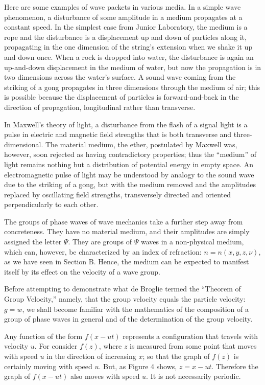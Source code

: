 Here are some examples of wave packets in various media. In a simple
wave phenomenon, a disturbance of some amplitude in a medium propagates
at a constant speed. In the simplest case from Junior Laboratory, the
medium is a rope and the disturbance is a displacement up and down of
particles along it, propagating in the one dimension of the string's
extension when we shake it up and down once. When a rock is dropped into
water, the disturbance is again an up-and-down displacement in the
medium of water, but now the propagation is in two dimensions across the
water's surface. A sound wave coming from the striking of a gong
propagates in three dimensions through the medium of air; this is
possible because the displacement of particles is forward-and-back in
the direction of propagation, longitudinal rather than transverse.

In Maxwell's theory of light, a disturbance from the flash of a signal
light is a pulse in electric and magnetic field strengths that is both
transverse and three-dimensional. The material medium, the ether,
postulated by Maxwell was, however, soon rejected as having
contradictory properties; thus the ``medium'' of light remains nothing
but a distribution of potential energy in empty space. An
electromagnetic pulse of light may be understood by analogy to the sound
wave due to the striking of a gong, but with the medium removed and the
amplitudes replaced by oscillating field strengths, transversely
directed and oriented perpendicularly to each other.

The groups of phase waves of wave mechanics take a further step away
from concreteness. They have no material medium, and their amplitudes
are simply assigned the letter $\Psi$. They are groups of $\Psi$
waves in a non-physical medium, which can, however, be characterized by
an index of refraction: $n = n(x,y,z,\nu)$, as we have seen in
Section B. Hence, the medium can be expected to manifest itself by its
effect on the velocity of a wave group.

Before attempting to demonstrate what de Broglie termed the ``Theorem of
Group Velocity,'' namely, that the group velocity equals the particle
velocity: $g = w$, we shall become familiar with the
mathematics of the composition of a group of phase waves in general and
of the determination of the group velocity.

Any function of the form $f(x-ut)$ represents a
configuration that travels with velocity $u$. For consider
$f(z)$, where $z$ is measured from some point that
moves with speed $u$ in the direction of increasing $x$; so
that the graph of $f(z)$ is certainly moving with speed
$u$. But, as Figure 4 shows, $z = x-ut$.
Therefore the graph of $f(x-ut)$ also moves with
speed $u$. It is not necessarily periodic.

